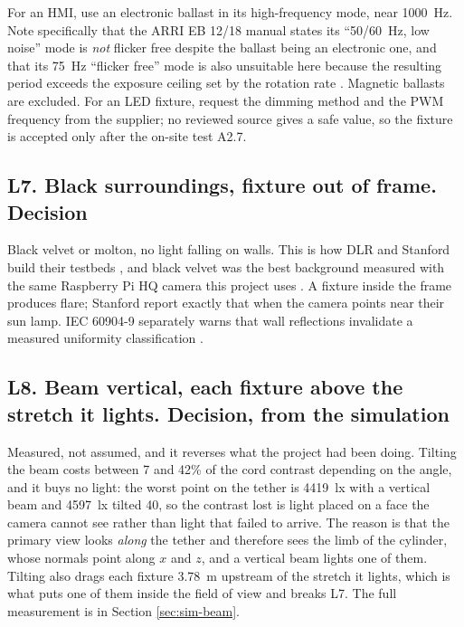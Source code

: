 For an HMI, use an electronic ballast in its high-frequency mode, near
1000~Hz. Note specifically that the ARRI EB 12/18 manual states its
``50/60~Hz, low noise'' mode is \emph{not} flicker free despite the ballast
being an electronic one, and that its 75~Hz ``flicker free'' mode is also
unsuitable here because the resulting period exceeds the exposure ceiling set
by the rotation rate \cite{arri_eb1218_manual}. Magnetic ballasts are
excluded. For an LED fixture, request the dimming method and the PWM
frequency from the supplier; no reviewed source gives a safe value, so the
fixture is accepted only after the on-site test A2.7.

\subsection*{L7. Black surroundings, fixture out of frame.
\textnormal{Decision}}

Black velvet or molton, no light falling on walls. This is how DLR and
Stanford build their testbeds \cite{benninghoff2017epos, park2021tron}, and
black velvet was the best background measured with the same Raspberry Pi HQ
camera this project uses \cite{pauly2022spacelab}. A fixture inside the frame
produces flare; Stanford report exactly that when the camera points near their
sun lamp. IEC 60904-9 separately warns that wall reflections invalidate a
measured uniformity classification \cite{iec60904_9_2020}.

\subsection*{L8. Beam vertical, each fixture above the stretch it lights.
\textnormal{Decision, from the simulation}}

Measured, not assumed, and it reverses what the project had been doing.
Tilting the beam costs between 7 and 42\% of the cord contrast depending on
the angle, and it buys no light: the worst point on the tether is 4419~lx
with a vertical beam and 4597~lx tilted 40\textdegree, so the contrast lost
is light placed on a face the camera cannot see rather than light that failed
to arrive. The reason is that the primary view looks \emph{along} the tether
and therefore sees the limb of the cylinder, whose normals point along $x$
and $z$, and a vertical beam lights one of them. Tilting also drags each
fixture 3.78~m upstream of the stretch it lights, which is what puts one of
them inside the field of view and breaks L7. The full measurement is in
Section \ref{sec:sim-beam}.

